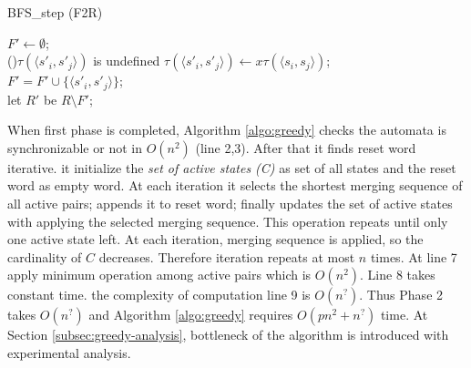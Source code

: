 \documentclass[12pt]{article}
\newcommand{\comment}[2]{{\color{red}{\bf (#1: #2)}}}
\begin{document}
\renewcommand{\baselinestretch}{0.9}
\begin{algorithm}
	\label{algo:BFS-step-F2R}
	\caption{{BFS\_step (F2R)}}
	
	
	$F' \longleftarrow \emptyset$;\\
	{
		{
			{
				\If(){$\tau(\langle s'_i,s'_j\rangle)$ is undefined}
				{
					$\tau(\langle s'_i,s'_j\rangle) \longleftarrow x \tau(\langle s_i,s_j \rangle)$;\\
					$F' = F' \cup \{ \langle s'_i,s'_j\rangle  \} $;\\
				}
			}
		}
	}
	let $R'$ be $R \setminus F'$;
\end{algorithm}
\renewcommand{\baselinestretch}{1}

When first phase is completed, Algorithm \ref{algo:greedy} checks the automata is synchronizable or not in $O(n^2)$ (line 2,3). After that it finds reset word iterative. it initialize the \textit{set of active states (C)} as set of all states and the reset word as empty word. At each iteration it selects the shortest merging sequence of all active pairs; appends it to reset word; finally updates the set of active states with applying the selected merging sequence. This operation repeats until only one active state left. At each iteration, merging sequence is applied, so the cardinality of $C$ decreases. Therefore iteration repeats at most $n$ times. At line 7 apply minimum operation among active pairs which is $O(n^2)$. Line 8 takes constant time. the complexity of computation line 9 is $O(n^?)$. Thus Phase 2 takes $O(n^?)$ and Algorithm \ref{algo:greedy} requires $O(pn^2 + n^?)$ time. At Section \ref{subsec:greedy-analysis}, bottleneck of the algorithm is introduced with experimental analysis.

\comment{sertac}{complexity $O(n^3)$ mu demeliyiz yoksa $O(n^4)$ mu? interediate phaseden bahsetmeli miyiz?}
\end{document}
